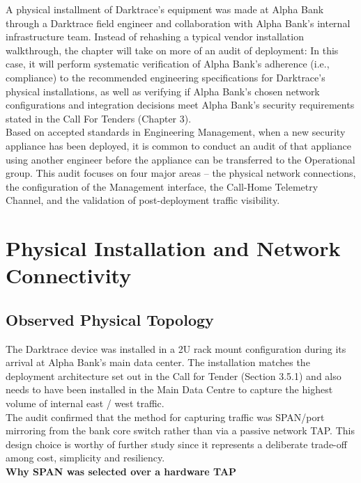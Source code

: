 \documentclass[12pt,a4paper]{report}
\begin{document}
A physical installment of Darktrace’s equipment was made at Alpha Bank through a Darktrace field engineer and collaboration with Alpha Bank’s internal infrastructure team. Instead of rehashing a typical vendor installation walkthrough, the chapter will take on more of an audit of deployment: In this case, it will perform systematic verification of Alpha Bank’s adherence (i.e., compliance) to the recommended engineering specifications for Darktrace's physical installations, as well as verifying if Alpha Bank’s chosen network configurations and integration decisions meet Alpha Bank’s security requirements stated in the Call For Tenders (Chapter 3).\\

Based on accepted standards in Engineering Management, when a new security appliance has been deployed, it is common to conduct an audit of that appliance using another engineer before the appliance can be transferred to the Operational group. This audit focuses on four major areas – the physical network connections, the configuration of the Management interface, the Call-Home Telemetry Channel, and the validation of post-deployment traffic visibility.

\section{Physical Installation and Network Connectivity}

\subsection{Observed Physical Topology}

The Darktrace device was installed in a 2U rack mount configuration during its arrival at Alpha Bank's main data center. The installation matches the deployment architecture set out in the Call for Tender (Section 3.5.1) and also needs to have been installed in the Main Data Centre to capture the highest volume of internal east / west traffic.\\

The audit confirmed that the method for capturing traffic was SPAN/port mirroring from the bank core switch rather than via a passive network TAP. This design choice is worthy of further study since it represents a deliberate trade-off among cost, simplicity and resiliency.\\

\noindent \textbf{Why SPAN was selected over a hardware TAP}
\end{document}
